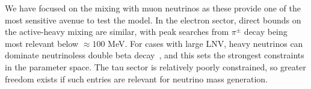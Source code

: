 We have focused on the mixing with muon neutrinos as these provide one of the most sensitive avenue to test the model. In the electron sector, direct bounds on the active-heavy mixing are similar, with peak searches from $\pi^\pm$ decay being most relevant below $\approx 100$ MeV. For cases with large LNV, heavy neutrinos can dominate neutrinoless double beta decay~\cite{LopezPavon:2012zg}, and this sets the strongest constraints in the parameter space. The tau sector is relatively poorly constrained, so greater freedom exists if such entries are relevant for neutrino mass generation. 

